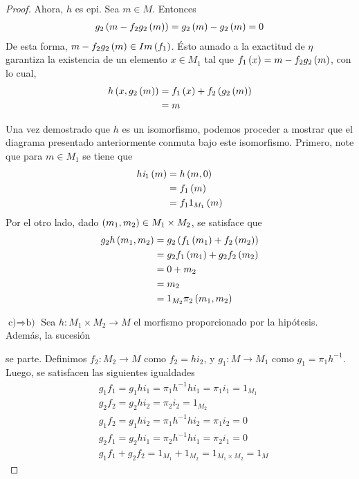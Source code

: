 \documentclass{article}
\begin{document}
\begin{enumerate}[label=\textbf{Ej \arabic*.}]
\begin{proof}
		Ahora, $h$ es epi. Sea $m \in M$. Entonces 
		\begin{align*}
			g_{2}\left(m-f_{2}g_{2}\left(m\right)\right)=g_{2}\left(m\right)-g_{2}\left(m\right)=0
		\end{align*}
		De esta forma, $m-f_{2}g_{2}\left(m\right) \in Im\left(f_{1}\right)$. Ésto aunado a la exactitud de $\eta$ garantiza la existencia de un elemento $x \in M_{1}$ tal que $f_{1}\left(x\right)=m-f_{2}g_{2}\left(m\right)$, con lo cual,
		\begin{align*}
			h\left(x,g_{2}\left(m\right)\right)&=f_{1}\left(x\right)+f_{2}\left(g_{2}\left(m\right)\right)\\
			&=m
		\end{align*}
		
		Una vez demostrado que $h$ es un isomorfismo, podemos proceder a mostrar que el diagrama presentado anteriormente conmuta bajo este isomorfismo. Primero, note que para $m \in M_{1}$ se tiene que 
		\begin{align*}
			h\textit{i}_{1}\left(m\right)&=h\left(m,0\right)\\
			&=f_{1}\left(m\right)\\
			&=f_{1}1_{M_{1}}\left(m\right)
		\end{align*}
		Por el otro lado, dado $\left(m_{1},m_{2}\right) \in M_{1} \times M_{2}$, se satisface que
		\begin{align*}
			g_{2}h\left(m_{1},m_{2}\right)&=g_{2}\left(f_{1}\left(m_{1}\right)+f_{2}\left(m_{2}\right)\right)\\
			&=g_{2}f_{1}\left(m_{1}\right)+g_{2}f_{2}\left(m_{2}\right)\\
			&=0+m_{2}\\
			&=m_{2}\\
			&=1_{M_{2}}\pi_{2}\left(m_{1},m_{2}\right)
		\end{align*}
		
		$\boxed{\text{c)}\Rightarrow\text{b)}}$ Sea $h:M_{1} \times M_{2} \longrightarrow M$ el morfismo proporcionado por la hipótesis. Además, la sucesión
		se parte. Definimos $f_{2}:M_{2} \longrightarrow M$ como $f_{2}=hi_{2}$, y $g_{1}:M \longrightarrow M_{1}$ como $g_{1}=\pi_{1}h^{-1}$.\\
		
		Luego, se satisfacen las siguientes igualdades
		\begin{align*}
			& g_{1}f_{1}=g_{1}hi_{1}=\pi_{1}h^{-1}hi_{1}=\pi_{1}i_{1}=1_{M_{1}}\\
			& g_{2}f_{2}=g_{2}hi_{2}=\pi_{2}i_{2}=1_{M_{2}}\\
			& g_{1}f_{2}=g_{1}hi_{2}=\pi_{1}h^{-1}hi_{2}=\pi_{1}i_{2}=0\\
			& g_{2}f_{1}=g_{2}hi_{1}=\pi_{2}h^{-1}hi_{1}=\pi_{2}i_{1}=0\\
			& g_{1}f_{1}+g_{2}f_{2}=1_{M_{1}}+1_{M_{2}}=1_{M_{1} \times M_{2}}=1_{M}
		\end{align*}
		

\end{proof}
\end{enumerate}
\end{document}
